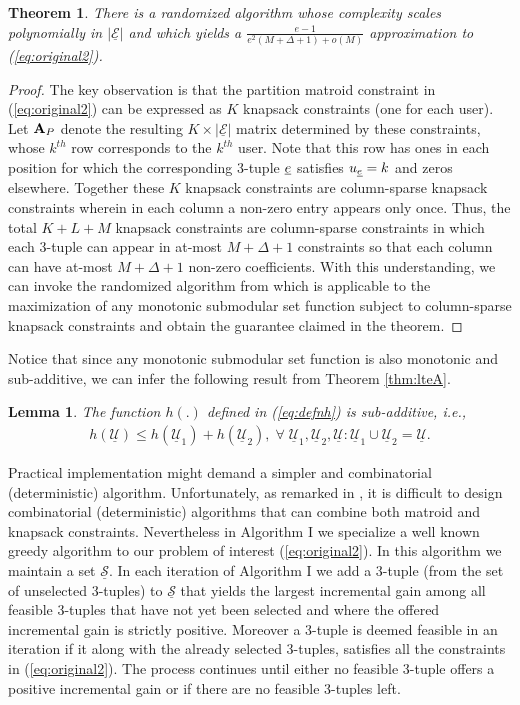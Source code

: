 \documentclass[11pt] {article}
\newcommand{\Uulc} {{\underline{\mathcal U}}}
\newcommand{\Eulc} {{\underline{\mathcal E}}}
\newcommand{\Sulc} {{\underline{\mathcal S}}}
\newtheorem{theorem}{Theorem}
\newtheorem{lemma}{Lemma}
\begin{document}
\begin{theorem}
There is a randomized algorithm whose complexity scales polynomially in $|\Eulc|$ and which yields a  $\frac{e-1}{e^2(M+\Delta+1) + o(M)}$ approximation to (\ref{eq:original2}).
\end{theorem}
\begin{proof} The key observation is that the partition matroid constraint in (\ref{eq:original2}) can be expressed as $K$ knapsack constraints (one for each user). Let ${{\mathbf A}}_P$ denote the resulting $K\times |\Eulc|$ matrix determined by these constraints, whose $k^{th}$ row corresponds to the $k^{th}$ user. Note that this row has ones in each position for which the corresponding 3-tuple ${\underline e}$ satisfies $u_{{\underline e}}=k$ and zeros elsewhere.
Together these $K$ knapsack constraints are column-sparse knapsack constraints wherein in each column  a non-zero entry appears only once.  Thus, the total $K+L+M$ knapsack constraints are column-sparse constraints in which each 3-tuple can appear in at-most $M+\Delta+1$ constraints so that each column can have at-most $M+\Delta+1$ non-zero coefficients.
 With this understanding, we can invoke the randomized algorithm from \cite{bansal:sparse} which is applicable to the maximization of any monotonic submodular set function subject to column-sparse knapsack constraints and obtain the guarantee claimed in the theorem.\end{proof}

Notice that since any monotonic submodular set function is also monotonic and sub-additive, we can infer the following result from  Theorem \ref{thm:lteA}.
\begin{lemma}\label{lem:lemH}
The function $h(.)$ defined in (\ref{eq:defnh}) is sub-additive, i.e.,
\begin{eqnarray}
  h(\Uulc)\leq h(\Uulc_1)+ h(\Uulc_2),\;\forall\;\Uulc_1,\Uulc_2,\Uulc: \Uulc_1\cup\Uulc_2=\Uulc.
   \end{eqnarray}
\end{lemma}






Practical implementation might demand a  simpler and combinatorial (deterministic) algorithm.  Unfortunately, as remarked in \cite{chandra:submod}, it is difficult to design combinatorial (deterministic) algorithms that can combine both matroid and knapsack constraints. Nevertheless in Algorithm I  we specialize a well known greedy algorithm to our problem of interest (\ref{eq:original2}).
 In this algorithm we maintain a set $\Sulc$. In each iteration of  Algorithm I we add a 3-tuple (from the set of unselected 3-tuples) to $\Sulc$ that yields the largest incremental gain among all feasible 3-tuples that have not yet been selected and where the offered incremental gain is strictly positive. Moreover a 3-tuple is deemed feasible in an iteration if it along with the already selected 3-tuples, satisfies all the constraints in (\ref{eq:original2}). The process continues until either no feasible 3-tuple offers a positive incremental gain or if there are no feasible 3-tuples left.
\end{document}
